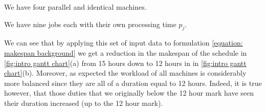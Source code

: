 \vspace{\baselineskip}
{\addtolength{\leftskip}{5mm}
\noindent
We have four parallel and identical machines.\par

\vspace{\baselineskip}
\noindent
We have nine jobs each with their own processing time $p_j$.\par
 
}

\vspace{\baselineskip}
\noindent
We can see that by applying this set of input data to formulation \ref{equation: makespan background} we get a reduction in the makespan of the schedule in \ref{fig:intro gantt chart}(a) from 15 hours down to 12 hours in in \ref{fig:intro gantt chart}(b). Moreover, as expected the workload of all machines is considerably more balanced since they are all of a duration equal to 12 hours. Indeed, it is true however, that those duties that we originally below the 12 hour mark have seen their duration increased (up to the 12 hour mark).


